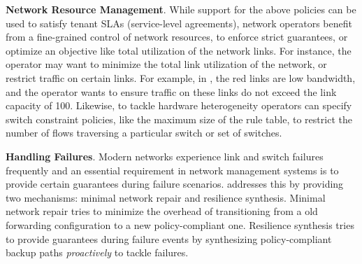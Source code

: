 \begin{compactitemize}
\item \textbf{Network Resource Management}. While support for the above
policies can be used to satisfy tenant SLAs (service-level agreements), network operators 
benefit from a fine-grained control of network resources, to enforce
strict guarantees, or optimize an objective like total utilization of the network
links. 
For instance, the operator may want to minimize the total link utilization 
of the network, or restrict traffic on certain links. For example, in ,
the red links are low bandwidth, and the operator wants to ensure
traffic on these links do not exceed the link capacity of 100.
  Likewise, to tackle hardware heterogeneity operators can specify
  switch constraint policies, like the maximum size of the rule table, to
  restrict the number of flows traversing a particular switch or set
  of switches.
 
 \item \textbf{Handling Failures}. Modern networks experience link and switch failures
 frequently and an essential requirement in network management systems is to
 provide certain guarantees during failure scenarios. \name addresses this by
 providing two mechanisms: minimal network repair and resilience synthesis. 
 Minimal network repair tries to minimize the overhead of transitioning from a
 old forwarding configuration to a new policy-compliant one. Resilience synthesis
 tries to provide guarantees during failure events by synthesizing policy-compliant
 backup paths \emph{proactively} to tackle failures.
\end{compactitemize}
